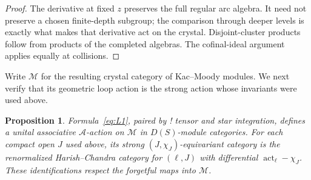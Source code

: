 \documentclass[11pt]{article}
\numberwithin{equation}{section}
\newtheorem{proposition}[theorem]{Proposition}
\theoremstyle{definition}
\theoremstyle{remark}
\begin{document}
\begin{proof}
The derivative at fixed $z$ preserves the full regular arc
algebra.  It need not preserve a chosen finite-depth subgroup;
the comparison through deeper levels is exactly what makes that
derivative act on the crystal.  Disjoint-cluster products follow
from products of the completed algebras.  The cofinal-ideal
argument applies equally at collisions.
\end{proof}

Write $\mathcal M$ for the resulting crystal category of Kac--Moody
modules.  We next verify that its geometric loop action is the strong
action whose invariants were used above.

\begin{proposition}\label{loop:strong-action}
Formula~\eqref{eq:L1}, paired by ! tensor and star integration, defines
a unital associative $\mathcal A$-action on $\mathcal M$ in
$D(S)$-module categories.  For each compact open $J$ used above, its
strong $(J,\chi_J)$-equivariant category is the renormalized
Harish--Chandra category for $(\ell,J)$ with differential
$\operatorname{act}_\ell-\chi_J$.  These identifications respect
the forgetful maps into $\mathcal M$.
\end{proposition}
\end{document}
